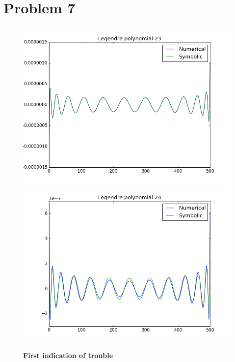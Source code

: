 \documentclass[a4paper,norsk]{article}
\begin{document}
\section*{Problem 7}
\begin{figure}[h!]
	\centering
	\caption*{\textbf{First indication of trouble}}
	\includegraphics[scale=0.36]{n23.png}
	\includegraphics[scale=0.36]{n24.png}
\end{figure}
\end{document}

